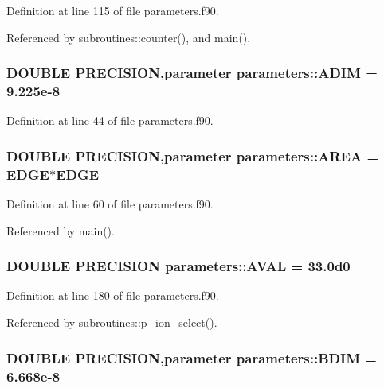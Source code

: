 Definition at line 115 of file parameters.f90.

Referenced by subroutines::counter(), and main().\hypertarget{namespaceparameters_ad2ed15127be0caca99788b8acc6e605b}{
\subsubsection[{ADIM}]{\setlength{\rightskip}{0pt plus 5cm}DOUBLE PRECISION,parameter {\bf parameters::ADIM} = 9.225e-\/8}}
\label{namespaceparameters_ad2ed15127be0caca99788b8acc6e605b}


Definition at line 44 of file parameters.f90.\hypertarget{namespaceparameters_aee8d50a231f8beed7edc0ff5ba2437f4}{
\subsubsection[{AREA}]{\setlength{\rightskip}{0pt plus 5cm}DOUBLE PRECISION,parameter {\bf parameters::AREA} = {\bf EDGE}$\ast${\bf EDGE}}}
\label{namespaceparameters_aee8d50a231f8beed7edc0ff5ba2437f4}


Definition at line 60 of file parameters.f90.

Referenced by main().\hypertarget{namespaceparameters_ae2d7b8b9e8df09f194ff75d43b02afbb}{
\subsubsection[{AVAL}]{\setlength{\rightskip}{0pt plus 5cm}DOUBLE PRECISION {\bf parameters::AVAL} = 33.0d0}}
\label{namespaceparameters_ae2d7b8b9e8df09f194ff75d43b02afbb}


Definition at line 180 of file parameters.f90.

Referenced by subroutines::p\_\-ion\_\-select().\hypertarget{namespaceparameters_a3a667857cb5e332f397b7ff0e96dbb85}{
\subsubsection[{BDIM}]{\setlength{\rightskip}{0pt plus 5cm}DOUBLE PRECISION,parameter {\bf parameters::BDIM} = 6.668e-\/8}}
\label{namespaceparameters_a3a667857cb5e332f397b7ff0e96dbb85}


